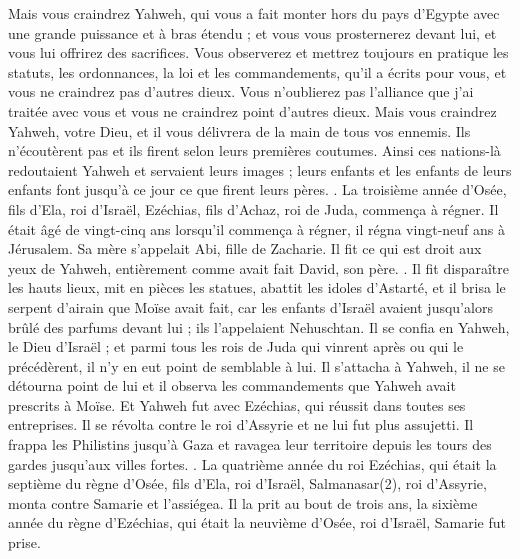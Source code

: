 \begin{multicols}{2}
Mais vous craindrez Yahweh, qui vous a fait monter hors du pays d'Egypte avec une grande puissance et à bras étendu ; et vous vous prosternerez devant lui, et vous lui offrirez des sacrifices.
Vous observerez et mettrez toujours en pratique les statuts, les ordonnances, la loi et les commandements, qu'il a écrits pour vous, et vous ne craindrez pas d'autres dieux.
Vous n'oublierez pas l'alliance que j'ai traitée avec vous et vous ne craindrez point d'autres dieux.
Mais vous craindrez Yahweh, votre Dieu, et il vous délivrera de la main de tous vos ennemis.
Ils n'écoutèrent pas et ils firent selon leurs premières coutumes.
Ainsi ces nations-là redoutaient Yahweh et servaient leurs images ; leurs enfants et les enfants de leurs enfants font jusqu'à ce jour ce que firent leurs pères.
.
\VerseOne{}La troisième année d'Osée, fils d'Ela, roi d'Israël, Ezéchias, fils d'Achaz, roi de Juda, commença à régner.
Il était âgé de vingt-cinq ans lorsqu'il commença à régner, il régna vingt-neuf ans à Jérusalem. Sa mère s'appelait Abi, fille de Zacharie.
Il fit ce qui est droit aux yeux de Yahweh, entièrement comme avait fait David, son père.
.
Il fit disparaître les hauts lieux, mit en pièces les statues, abattit les idoles d'Astarté, et il brisa le serpent d'airain que Moïse avait fait, car les enfants d'Israël avaient jusqu'alors brûlé des parfums devant lui ; ils l'appelaient Nehuschtan.
Il se confia en Yahweh, le Dieu d'Israël ; et parmi tous les rois de Juda qui vinrent après ou qui le précédèrent, il n'y en eut point de semblable à lui.
Il s'attacha à Yahweh, il ne se détourna point de lui et il observa les commandements que Yahweh avait prescrits à Moïse.
Et Yahweh fut avec Ezéchias, qui réussit dans toutes ses entreprises. Il se révolta contre le roi d'Assyrie et ne lui fut plus assujetti.
Il frappa les Philistins jusqu'à Gaza et ravagea leur territoire depuis les tours des gardes jusqu'aux villes fortes.
.
La quatrième année du roi Ezéchias, qui était la septième du règne d'Osée, fils d'Ela, roi d'Israël, Salmanasar(2), roi d'Assyrie, monta contre Samarie et l'assiégea.
Il la prit au bout de trois ans, la sixième année du règne d'Ezéchias, qui était la neuvième d'Osée, roi d'Israël, Samarie fut prise.

\end{multicols}
